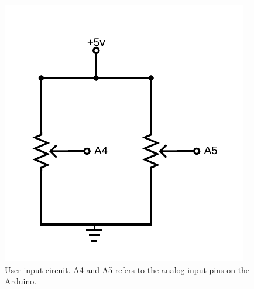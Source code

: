 \documentclass{article}
\begin{document}
\begin{figure}[h]
  \centering
  \includegraphics[width=.75\textwidth]{media/input2}
  \caption{User input circuit. A4 and A5 refers to the analog input pins on the Arduino.}
  \label{fig:input}
\end{figure}
\end{document}
